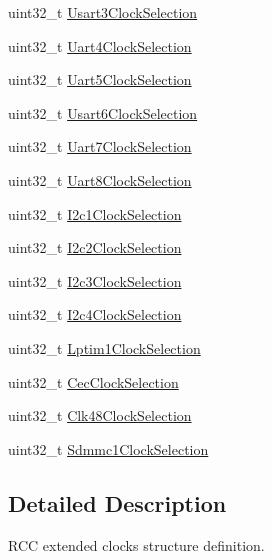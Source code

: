 \begin{DoxyCompactItemize}
uint32\+\_\+t \mbox{\hyperlink{struct_r_c_c___periph_c_l_k_init_type_def_acb2709b2b2bede8c2399a4f2030fe86a}{Usart3\+Clock\+Selection}}
\item 
uint32\+\_\+t \mbox{\hyperlink{struct_r_c_c___periph_c_l_k_init_type_def_aabd6a82d7fb65c1223519d96b03aa747}{Uart4\+Clock\+Selection}}
\item 
uint32\+\_\+t \mbox{\hyperlink{struct_r_c_c___periph_c_l_k_init_type_def_a9f564245930ae4f09c1b0e4dd29e4bce}{Uart5\+Clock\+Selection}}
\item 
uint32\+\_\+t \mbox{\hyperlink{struct_r_c_c___periph_c_l_k_init_type_def_a2031adb7b4c32fe58dc9b73cfa69b908}{Usart6\+Clock\+Selection}}
\item 
uint32\+\_\+t \mbox{\hyperlink{struct_r_c_c___periph_c_l_k_init_type_def_aa7309f9ed0c0a9139cfb8a12cdccf40e}{Uart7\+Clock\+Selection}}
\item 
uint32\+\_\+t \mbox{\hyperlink{struct_r_c_c___periph_c_l_k_init_type_def_a8dfbd2d00e84d810fc683fe64b4e8374}{Uart8\+Clock\+Selection}}
\item 
uint32\+\_\+t \mbox{\hyperlink{struct_r_c_c___periph_c_l_k_init_type_def_ac5531272c0509cb646c4ddac15392dbf}{I2c1\+Clock\+Selection}}
\item 
uint32\+\_\+t \mbox{\hyperlink{struct_r_c_c___periph_c_l_k_init_type_def_a08536f08136780e6566a68f1e33be4fb}{I2c2\+Clock\+Selection}}
\item 
uint32\+\_\+t \mbox{\hyperlink{struct_r_c_c___periph_c_l_k_init_type_def_a8497daa4d66fdc5f0033e798559f65a2}{I2c3\+Clock\+Selection}}
\item 
uint32\+\_\+t \mbox{\hyperlink{struct_r_c_c___periph_c_l_k_init_type_def_a4c4c2ad7382843b24eda31f0d8b4bcf6}{I2c4\+Clock\+Selection}}
\item 
uint32\+\_\+t \mbox{\hyperlink{struct_r_c_c___periph_c_l_k_init_type_def_a1a290839542d3836d0cfe98142b5f219}{Lptim1\+Clock\+Selection}}
\item 
uint32\+\_\+t \mbox{\hyperlink{struct_r_c_c___periph_c_l_k_init_type_def_a344e2489c3faf2150fafbafc86b86812}{Cec\+Clock\+Selection}}
\item 
uint32\+\_\+t \mbox{\hyperlink{struct_r_c_c___periph_c_l_k_init_type_def_abcb1d9026f5ad149b6e0d1194f82b852}{Clk48\+Clock\+Selection}}
\item 
uint32\+\_\+t \mbox{\hyperlink{struct_r_c_c___periph_c_l_k_init_type_def_a4c0d4ae0c49428a29497ed36ba2685f9}{Sdmmc1\+Clock\+Selection}}
\end{DoxyCompactItemize}


\subsection{Detailed Description}
R\+CC extended clocks structure definition. 

